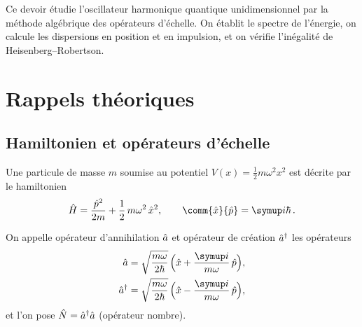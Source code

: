 
\begin{resume}
  Ce devoir étudie l'oscillateur harmonique quantique unidimensionnel par la
  méthode algébrique des opérateurs d'échelle. On établit le spectre de
  l'énergie, on calcule les dispersions en position et en impulsion, et on
  vérifie l'inégalité de Heisenberg–Robertson.
\end{resume}

\section{Rappels théoriques}

\subsection{Hamiltonien et opérateurs d'échelle}

Une particule de masse $m$ soumise au potentiel $V(x)=\tfrac12 m\omega^{2}x^{2}$
est décrite par le hamiltonien
\begin{equation}
  \op{H} = \frac{\op{p}^{2}}{2m} + \frac{1}{2}\,m\omega^{2}\,\op{x}^{2},
  \qquad \comm{\op{x}}{\op{p}} = \ii\hbar\,.
  \label{eq:H}
\end{equation}

\begin{definition}\label{def:echelle}
  On appelle opérateur d'annihilation $\hat{a}$ et opérateur de création
  $\hat{a}^{\dagger}$ les opérateurs
  \begin{align}
    \op{a}  &= \sqrt{\frac{m\omega}{2\hbar}}\,\Bigl(\op{x} + \frac{\ii}{m\omega}\,\op{p}\Bigr),
    \label{eq:a}\\
    \op{a}\adj &= \sqrt{\frac{m\omega}{2\hbar}}\,\Bigl(\op{x} - \frac{\ii}{m\omega}\,\op{p}\Bigr),
    \label{eq:adag}
  \end{align}
  et l'on pose $\hat{N}=\hat{a}^{\dagger}\hat{a}$ (opérateur nombre).
\end{definition}

